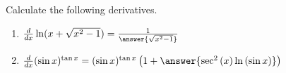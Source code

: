 \documentclass{ximera}
\author{Nela Lakos}
\begin{document}
\begin{exercise}

Calculate the following derivatives.
\begin{enumerate}
\item $\ddx\ln(x+\sqrt{x^2-1}) =\frac{1}{\answer{\sqrt{x^2-1}}}$\\
\item$ \ddx(\sin x)^{\tan{x}} = (\sin{x})^{\tan{x}}\left(1+\answer{\sec^2{(x)}\ln{(\sin{x})}}\right)$\\
\end{enumerate}
\end{exercise}
\end{document}
